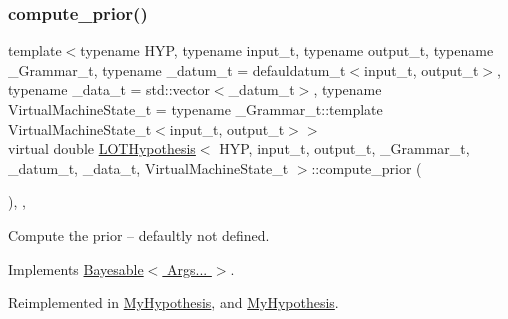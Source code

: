 \mbox{\label{class_l_o_t_hypothesis_af215c4833e81984364703b2e4cb78dc7}} 
\subsubsection{\texorpdfstring{compute\+\_\+prior()}{compute\_prior()}}
{\footnotesize\ttfamily template$<$typename H\+YP, typename input\+\_\+t, typename output\+\_\+t, typename \+\_\+\+Grammar\+\_\+t, typename \+\_\+datum\+\_\+t = defauldatum\+\_\+t$<$input\+\_\+t, output\+\_\+t$>$, typename \+\_\+data\+\_\+t = std\+::vector$<$\+\_\+datum\+\_\+t$>$, typename Virtual\+Machine\+State\+\_\+t = typename \+\_\+\+Grammar\+\_\+t\+::template Virtual\+Machine\+State\+\_\+t$<$input\+\_\+t, output\+\_\+t$>$$>$ \\
virtual double \hyperlink{class_l_o_t_hypothesis}{L\+O\+T\+Hypothesis}$<$ H\+YP, input\+\_\+t, output\+\_\+t, \+\_\+\+Grammar\+\_\+t, \+\_\+datum\+\_\+t, \+\_\+data\+\_\+t, Virtual\+Machine\+State\+\_\+t $>$\+::compute\+\_\+prior (\begin{DoxyParamCaption}{ }\end{DoxyParamCaption})\hspace{0.3cm}{\ttfamily [inline]}, {\ttfamily [override]}, {\ttfamily [virtual]}}



Compute the prior -- defaultly not defined. 



Implements \hyperlink{class_bayesable_a1b057a17212ced123545133e2297c01b}{Bayesable$<$ Args... $>$}.



Reimplemented in \hyperlink{class_my_hypothesis_ab092094c5fc31730de4f40609220bb18}{My\+Hypothesis}, and \hyperlink{class_my_hypothesis_a67477313b60b21158bbfaad35dc5d275}{My\+Hypothesis}.

\mbox{\label{class_l_o_t_hypothesis_a0ff11e5e328fcfa819a8dd9b5d57bd65}} 
